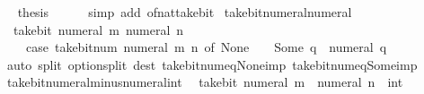 \begin{isabellebody}
\ \isamarkupfalse%
\ {\isacharquery}{\kern0pt}thesis\isanewline
\ \ \ \ \isamarkupfalse%
\ {\isacharparenleft}{\kern0pt}simp\ add{\isacharcolon}{\kern0pt}\ of{\isacharunderscore}{\kern0pt}nat{\isacharunderscore}{\kern0pt}take{\isacharunderscore}{\kern0pt}bit{\isacharparenright}{\kern0pt}\isanewline
{}\isamarkupfalse%
%
\endisatagproof
{\isafoldproof}%
%
\isadelimproof
\isanewline
%
\endisadelimproof
\isanewline
{}\isamarkupfalse%
\ take{\isacharunderscore}{\kern0pt}bit{\isacharunderscore}{\kern0pt}numeral{\isacharunderscore}{\kern0pt}numeral{\isacharcolon}{\kern0pt}\isanewline
\ \ {\isacartoucheopen}take{\isacharunderscore}{\kern0pt}bit\ {\isacharparenleft}{\kern0pt}numeral\ m{\isacharparenright}{\kern0pt}\ {\isacharparenleft}{\kern0pt}numeral\ n{\isacharparenright}{\kern0pt}\ {\isacharequal}{\kern0pt}\isanewline
\ \ \ \ {\isacharparenleft}{\kern0pt}case\ take{\isacharunderscore}{\kern0pt}bit{\isacharunderscore}{\kern0pt}num\ {\isacharparenleft}{\kern0pt}numeral\ m{\isacharparenright}{\kern0pt}\ n\ of\ None\ {\isasymRightarrow}\ {}\ {\isacharbar}{\kern0pt}\ Some\ q\ {\isasymRightarrow}\ numeral\ q{\isacharparenright}{\kern0pt}{\isacartoucheclose}\isanewline
%
\isadelimproof
\ \ %
\endisadelimproof
%
\isatagproof
{}\isamarkupfalse%
\ {\isacharparenleft}{\kern0pt}auto\ split{\isacharcolon}{\kern0pt}\ option{\isachardot}{\kern0pt}split\ dest{\isacharcolon}{\kern0pt}\ take{\isacharunderscore}{\kern0pt}bit{\isacharunderscore}{\kern0pt}num{\isacharunderscore}{\kern0pt}eq{\isacharunderscore}{\kern0pt}None{\isacharunderscore}{\kern0pt}imp\ take{\isacharunderscore}{\kern0pt}bit{\isacharunderscore}{\kern0pt}num{\isacharunderscore}{\kern0pt}eq{\isacharunderscore}{\kern0pt}Some{\isacharunderscore}{\kern0pt}imp{\isacharparenright}{\kern0pt}%
\endisatagproof
{\isafoldproof}%
%
\isadelimproof
\isanewline
%
\endisadelimproof
\isanewline
{}\isamarkupfalse%
\isanewline
\isanewline
{}\isamarkupfalse%
\ take{\isacharunderscore}{\kern0pt}bit{\isacharunderscore}{\kern0pt}numeral{\isacharunderscore}{\kern0pt}minus{\isacharunderscore}{\kern0pt}numeral{\isacharunderscore}{\kern0pt}int{\isacharcolon}{\kern0pt}\isanewline
\ \ {\isacartoucheopen}take{\isacharunderscore}{\kern0pt}bit\ {\isacharparenleft}{\kern0pt}numeral\ m{\isacharparenright}{\kern0pt}\ {\isacharparenleft}{\kern0pt}{\isacharminus}{\kern0pt}\ numeral\ n\ {\isacharcolon}{\kern0pt}{\isacharcolon}{\kern0pt}\ int{\isacharparenright}{\kern0pt}\ {\isacharequal}{\kern0pt}\isanewline

\end{isabellebody}
